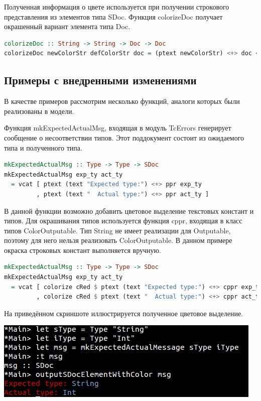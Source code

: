 Полученная информация о цвете используется при получении строкового представления из элементов типа SDoc. Функция colorizeDoc получает окрашенный вариант элемента типа Doc.

\begin{lstlisting}[language=Haskell]
colorizeDoc :: String -> String -> Doc -> Doc
colorizeDoc newColorStr defColorStr doc = (ptext newColorStr) <+> doc <+> (ptext defColorStr)
\end{lstlisting}


\subsection{Примеры с внедренными изменениями}

В качестве примеров рассмотрим несколько функций, аналоги которых были реализованы в модели.

Функция mkExpectedActualMsg, входящая в модуль TcErrors генерирует сообщение о несоответствии типов. Этот поддокумент состоит из ожидаемого типа и полученного типа.

\begin{lstlisting}[language=Haskell]
mkExpectedActualMsg :: Type -> Type -> SDoc
mkExpectedActualMsg exp_ty act_ty
  = vcat [ ptext (text "Expected type:") <+> ppr exp_ty
         , ptext (text "  Actual type:") <+> ppr act_ty ]
\end{lstlisting}

В данной функции возможно добавить цветовое выделение текстовых констант и типов. Для окрашивания типов используется функция cppr, входящая в класс типов ColorOutputable. Тип String не имеет реализации для Outputable, поэтому для него нельзя реализовать ColorOutputable. В данном примере окраска строковых констант выполняется вручную.

\begin{lstlisting}[language=Haskell, caption=Реализация функции с изменениями]
mkExpectedActualMsg :: Type -> Type -> SDoc
mkExpectedActualMsg exp_ty act_ty
  = vcat [ colorize cRed $ ptext (text "Expected type:") <+> cppr exp_ty
         , colorize cRed $ ptext (text "  Actual type:") <+> cppr act_ty ]
\end{lstlisting}

На приведённом скриншоте иллюстрируется полученное цветовое выделение.

\centerline{\includegraphics{img/example1.png}}

